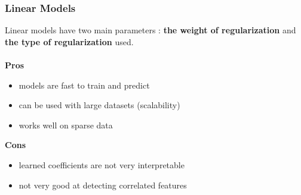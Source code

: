 \documentclass{beamer}
\begin{document}
\begin{frame}
  \frametitle{Linear Models}
  Linear models have two
  main parameters : \textbf{the weight of regularization} and \textbf{the
  type of regularization} used.
  \\~\\
  \textbf{Pros}
  \begin{itemize}
    \item models are fast to train and predict
    \item can be used with large datasets (scalability)
    \item works well on sparse data
  \end{itemize}

  \textbf{Cons}
  \begin{itemize}
    \item learned coefficients are not very interpretable
    \item not very good at detecting correlated features
  \end{itemize}
\end{frame}
\end{document}
